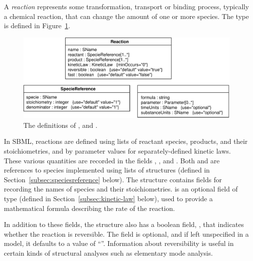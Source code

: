\documentclass[10pt]{cekarticle}
\newcommand{\vref}[1]{\ref{#1}}
\begin{document}
A \emph{reaction} represents some transformation, transport or binding
process, typically a chemical reaction, that can change the amount of one
or more species.  The  type is defined in
Figure~\vref{fig:reaction}.  

\begin{figure}[htb]
  \centering
  \includegraphics[scale = 0.68]{reaction}
  \caption{The definitions of ,  and
    .} 
  \label{fig:reaction}
\end{figure}

In SBML, reactions are defined using lists of reactant species, products,
and their stoichiometries, and by parameter values for separately-defined
kinetic laws.  These various quantities are recorded in the fields
, , and .  Both
 and  are references to species
implemented using lists of  structures (defined in
Section~\ref{subsec:speciesreference} below).  The 
structure contains fields for recording the names of species and their
stoichiometries.   is an optional field of type
 (defined in Section~\ref{subsec:kinetic-law} below),
used to provide a mathematical formula describing the rate of the reaction.

In addition to these fields, the  structure also has a
boolean field, , that indicates whether the reaction is
reversible.  The field is optional, and if left unspecified in a model, it
defaults to a value of ``''.  Information about
reversibility is useful in certain kinds of structural analyses such as
elementary mode analysis.
\end{document}

